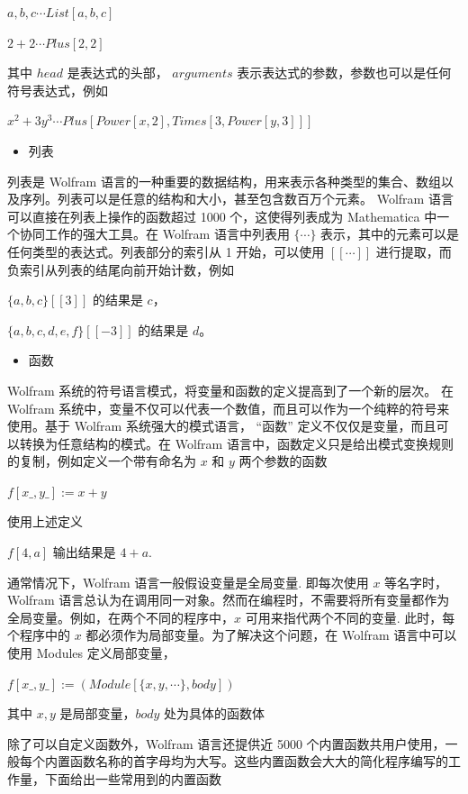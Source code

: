 ${a, b, c} \cdots List[a, b, c]$

$2 + 2 \cdots Plus[2, 2]$

其中 $head$ 是表达式的头部， $arguments$ 表示表达式的参数，参数也可以是任何符号表达式，例如

$x^2 + 3y^3 \cdots Plus[Power[x, 2], Times[3, Power[y, 3]]]$

\begin{itemize}
   \item 列表
\end{itemize}

列表是 Wolfram 语言的一种重要的数据结构，用来表示各种类型的集合、数组以及序列。列表可以是任意的结构和大小，甚至包含数百万个元素。 Wolfram 语言可以直接在列表上操作的函数超过 1000 个，这使得列表成为 Mathematica 中一个协同工作的强大工具。在 Wolfram 语言中列表用 $\{\cdots\}$ 表示，其中的元素可以是任何类型的表达式。列表部分的索引从 1 开始，可以使用 $[[\cdots]]$ 进行提取，而负索引从列表的结尾向前开始计数，例如

$\{a, b, c\}[[3]]$ 的结果是 $c$，

$\{a, b, c, d, e, f\}[[-3]]$ 的结果是 $d$。
 
\begin{itemize}
    \item 函数
\end{itemize}

Wolfram 系统的符号语言模式，将变量和函数的定义提高到了一个新的层次。 在 Wolfram 系统中，变量不仅可以代表一个数值，而且可以作为一个纯粹的符号来使用。基于 Wolfram 系统强大的模式语言， “函数” 定义不仅仅是变量，而且可以转换为任意结构的模式。在 Wolfram 语言中，函数定义只是给出模式变换规则的复制，例如定义一个带有命名为 $x$ 和 $y$ 两个参数的函数

$f[x\_ , y\_ ]:= x + y$

使用上述定义

$f[4, a]$ 输出结果是 $4 + a$.

通常情况下，Wolfram 语言一般假设变量是全局变量. 即每次使用  $x$ 等名字时，Wolfram 语言总认为在调用同一对象。然而在编程时，不需要将所有变量都作为全局变量。例如，在两个不同的程序中，$x$ 可用来指代两个不同的变量. 此时，每个程序中的 $x$ 都必须作为局部变量。为了解决这个问题，在 Wolfram 语言中可以使用  Modules 定义局部变量，

$f[x\_ , y\_ ]:= (Module[\{x, y, \cdots\}, body])$

其中 $x, y$ 是局部变量，$body$ 处为具体的函数体

除了可以自定义函数外，Wolfram 语言还提供近 5000 个内置函数共用户使用，一般每个内置函数名称的首字母均为大写。这些内置函数会大大的简化程序编写的工作量，下面给出一些常用到的内置函数

